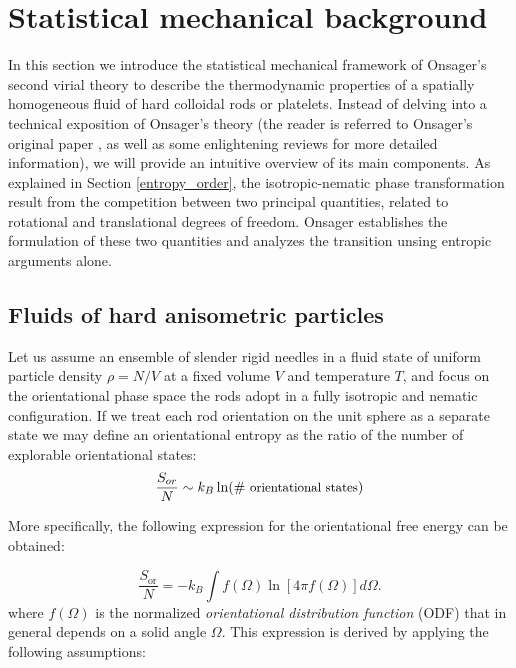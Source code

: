 \section{Statistical mechanical background}

In this section we introduce the statistical mechanical framework of  Onsager's second virial theory to describe the thermodynamic properties of a spatially homogeneous fluid of hard colloidal rods or platelets. Instead of delving into a technical exposition of Onsager's theory (the reader is referred to Onsager's original paper \cite{onsager1949}, as well as some enlightening reviews \cite{Vroege92, allenevans} for more detailed information), we will provide an intuitive overview of its main components. As explained in Section \ref{entropy_order}, the isotropic-nematic phase transformation result from the competition between two principal quantities, related to rotational and translational degrees of freedom. Onsager establishes the formulation of these two quantities and analyzes the transition unsing entropic arguments alone.

\subsection{Fluids of hard anisometric particles}

Let us assume an ensemble of slender rigid needles in a fluid state of uniform particle density $\rho = N/V$ at a fixed volume $V$ and temperature $T$, and focus on the orientational phase space the rods adopt in a fully isotropic and nematic configuration. If we treat each rod orientation on the unit sphere as a separate state we may define an orientational entropy as the ratio of the number of explorable orientational states:
\begin{equation}
\frac{S_{or}}{N} \sim k_{B} \ln ( \mbox{\# {\small orientational states}})
\label{sor}
\end{equation}

More specifically, the following expression for the orientational free energy can be obtained:

\begin{equation}
\frac{S_{\text{or}}}{N}=-k_B\int f(\Omega)\ln \left[4\pi f(\Omega)\right]d\Omega.
\label{0forient}
\end{equation}
where $f(\Omega)$ is the normalized {\em orientational distribution function} (ODF) that in general depends on a solid angle $\Omega$. This expression is derived by applying the following assumptions:


